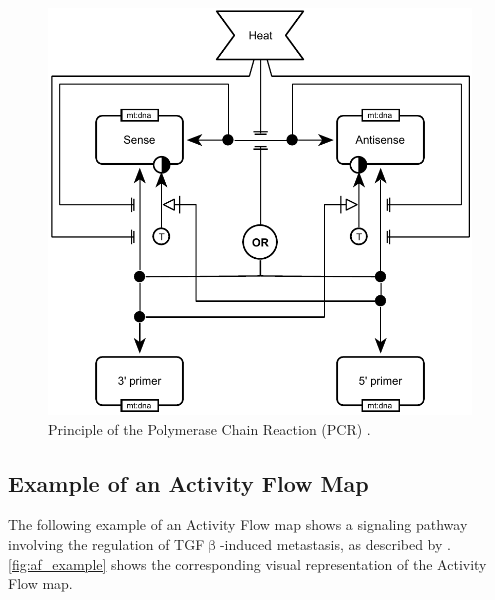 \begin{figure}[!ht]
  \centering
  \includegraphics[scale=0.69]{figures/er_example.pdf}
\caption{Principle of the Polymerase Chain Reaction (PCR) \citep{Mullis1986}.}
  \label{fig:er_example}
\end{figure}
\clearpage

\subsection{Example of an Activity Flow Map}

The following example of an Activity Flow map shows a signaling pathway involving the regulation of TGF$\upbeta$-induced metastasis, as described by \citet{Adorno2009}. \ref{fig:af_example} shows the corresponding visual representation of the Activity Flow map.

